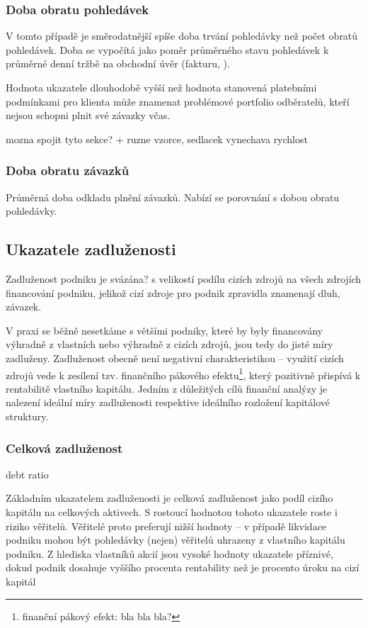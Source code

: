 \subsubsection{Doba obratu pohledávek}
V tomto případě je směrodatnější spíše doba trvání pohledávky než počet obratů pohledávek. Doba se vypočítá jako poměr průměrného stavu pohledávek k průměrné denní tržbě na obchodní úvěr (fakturu, ).

Hodnota ukazatele dlouhodobě vyšší než hodnota stanovená platebními podmínkami pro klienta může znamenat problémové portfolio odběratelů, kteří nejsou schopni plnit své závazky včas.

mozna spojit tyto sekce? + ruzne vzorce, sedlacek vynechava rychlost

\subsubsection{Doba obratu závazků}
Průměrná doba odkladu plnění závazků. Nabízí se porovnání s dobou obratu pohledávky. 





\subsection{Ukazatele zadluženosti}

Zadluženost podniku je svázána? s velikostí podílu cizích zdrojů na všech zdrojích financování podniku, jelikož cizí zdroje pro podnik zpravidla znamenají dluh, závazek.

V praxi se běžně nesetkáme s většími podniky, které by byly financovány výhradně z vlastních nebo výhradně z cizích zdrojů, jsou tedy do jisté míry zadluženy. Zadluženost obecně není negativní charakteristikou -- využití cizích zdrojů vede k zesílení tzv. finančního pákového efektu\footnote{finanční pákový efekt: bla bla bla?}, který pozitivně přispívá k rentabilitě vlastního kapitálu\cite{uk_zadl}. Jedním z důležitých cílů finanční analýzy je nalezení ideální míry zadluženosti respektive ideálního rozložení kapitálové struktury.


\subsubsection{Celková zadluženost}
debt ratio

Základním ukazatelem zadluženosti je celková zadluženost jako podíl cizího kapitálu na celkových aktivech. S rostoucí hodnotou tohoto ukazatele roste i riziko věřitelů. Věřitelé proto preferují nižší hodnoty -- v případě likvidace podniku mohou být pohledávky (nejen) věřitelů uhrazeny z vlastního kapitálu podniku.
Z hlediska vlastníků akcií jsou vysoké hodnoty ukazatele příznivé, dokud podnik dosahuje vyššího procenta rentability než je procento úroku na cizí kapitál

